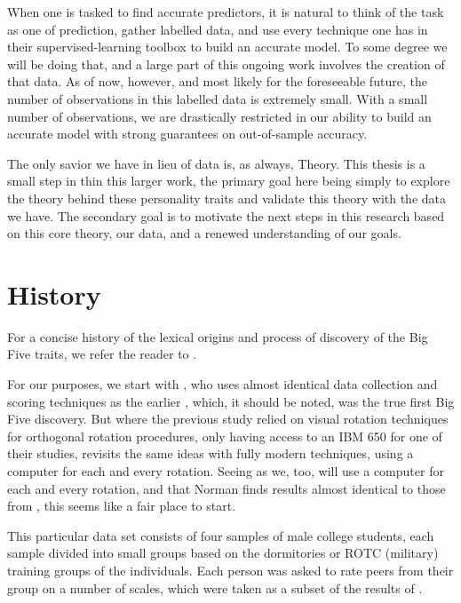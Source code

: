\documentclass[a4paper,12pt]{article}
\begin{document}
When one is tasked to find accurate predictors, it is natural to think of the task as one of prediction, gather labelled data, and use every technique one has in their supervised-learning toolbox to build an accurate model. To some degree we will be doing that, and a large part of this ongoing work involves the creation of that data. As of now, however, and most likely for the foreseeable future, the number of observations in this labelled data is extremely small. With a small number of observations, we are drastically restricted in our ability to build an accurate model with strong guarantees on out-of-sample accuracy.

The only savior we have in lieu of data is, as always, Theory. This thesis is a small step in thin this larger work, the primary goal here being simply to explore the theory behind these personality traits and validate this theory with the data we have. The secondary goal is to motivate the next steps in this research based on this core theory, our data, and a renewed understanding of our goals.

\section{History}

For a concise history of the lexical origins and process of discovery of the Big Five traits, we refer the reader to \cite{john1999}.

For our purposes, we start with \cite{norman1963}, who uses almost identical data collection and scoring techniques as the earlier \cite{tupes1961}, which, it should be noted, was the true first Big Five discovery. But where the previous study relied on visual rotation techniques for orthogonal rotation procedures, only having access to an IBM 650 for one of their studies, \cite{norman1963} revisits the same ideas with fully modern techniques, using a computer for each and every rotation. Seeing as we, too, will use a computer for each and every rotation, and that Norman finds results almost identical to those from \cite{tupes1961}, this seems like a fair place to start.

This particular data set consists of four samples of male college students, each sample divided into small groups based on the dormitories or ROTC (military) training groups of the individuals. Each person was asked to rate peers from their group on a number of scales, which were taken as a subset of the results of \cite{tupes1958}.
\end{document}
